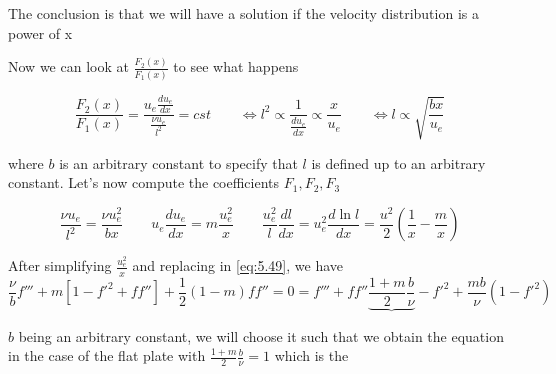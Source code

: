 			The conclusion is that we will have a solution if the velocity distribution is a power of x 
			
			\begin{center}
			\end{center}
			
			Now we can look at $\frac{F_2(x)}{F_1(x)}$ to see what happens
			
			\begin{equation}
				\frac{F_2(x)}{F_1(x)} = \frac{u_e \frac{du_e}{dx}}{\frac{\nu u_e}{l^2}} = cst \qquad \Leftrightarrow l^2 \propto \frac{1}{\frac{du_e}{dx}} \propto \frac{x}{u_e} \qquad \Leftrightarrow l \propto \sqrt{\frac{bx}{u_e}}
			\end{equation}
			
			where $b$ is an arbitrary constant to specify that $l$ is defined up to an arbitrary constant. Let's now compute the coefficients $F_1, F_2, F_3$ 
			
			\begin{equation}
				\frac{\nu u_e }{l^2} = \frac{\nu u_e^2}{bx} \qquad u_e \frac{du_e}{dx} = m\frac{u_e^2}{x} \qquad \frac{u_e^2}{l}\frac{dl}{dx} = u_e^2\frac{d\ln l}{dx} = \frac{u^2}{2} \left( \frac{1}{x} - \frac{m}{x} \right)
			\end{equation}
			
			After simplifying $\frac{u_e^2}{x}$ and replacing in \eqref{eq:5.49}, we have 
			\begin{equation}
				\frac{\nu}{b} f''' + m \left[1 - f'^2 + ff'' \right] + \frac{1}{2} ( 1 - m ) ff'' = 0 = f''' + ff'' \underbrace{\frac{1+m}{2} \frac{b}{\nu}} - f'^2 + \frac{mb}{\nu} (1-f'^2) 
			\end{equation}
			
			$b$ being an arbitrary constant, we will choose it such that we obtain the equation in the case of the flat plate with $\frac{1+m}{2} \frac{b}{\nu} = 1$ which is the 
			
			\begin{center}
			\end{center}
			
